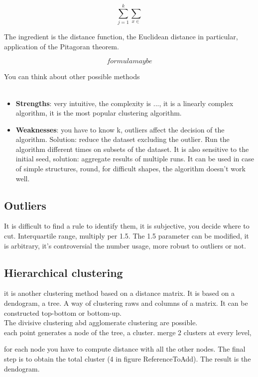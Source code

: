$$\sum_{j=1}^k\sum_{x\in}$$

The ingredient is the distance function, the Euclidean distance in particular, application of the Pitagoran theorem.

$$formula maybe$$

You can think about other possible methods\\\\

\begin{itemize}
\item \textbf{Strengths}: very intuitive, the complexity is ..., it is a linearly complex algorithm, it is the most popular clustering algorithm.\\
	\item \textbf{Weaknesses}: you have to know k, outliers affect the decision of the algorithm. Solution: reduce the dataset excluding the outlier. Run the algorithm different times on subsets of the dataset. It is also sensitive to the initial seed, solution: aggregate results of multiple runs. It can be used in case of simple structures, round, for difficult shapes, the algorithm doesn't work well.
\end{itemize}
	
\subsection{Outliers}
It is difficult to find a rule to identify them, it is subjective, you decide where to cut.  Interquartile range, multiply per 1.5. The 1.5 parameter can be modified, it is arbitrary, it's controversial the number usage, more robust to outliers or not. 

\subsection{Hierarchical clustering} 
it is another clustering method based on a distance matrix. It is based on a dendogram, a tree. A way of clustering raws and columns of a matrix. It can be constructed top-bottom or bottom-up. \\

The divisive clustering abd agglomerate clustering are possible.\\

each point generates a node of the tree, a cluster. merge 2 clusters at every level, 

for each node you have to compute distance with all the other nodes. The final step is to obtain the total cluster (4 in figure ReferenceToAdd). The result is the dendogram.\\


